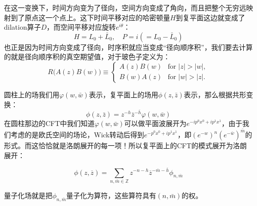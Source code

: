在这一变换下，时间方向变为了径向，空间方向变成了角向，而且把整个无穷远映射到了原点这一个点上。这下时间平移对应的哈密顿量$H$到复平面这边就变成了dilation算子$D$，而空间平移对应旋转$e^{i\theta}$：
\begin{equation}
		\boxed{H=L_0+\bar {L}_0,\quad P=i\left(=L_0-\bar {L}_0\right)}
\end{equation}
也正是因为时间方向变成了径向，时序积就应当变成“径向顺序积”，我们要去计算的就是径向顺序积的真空期望值，对于玻色子定义为：
\begin{equation}
	R\bigl(A(z)B(w)\bigr)\equiv\begin{cases}{}A(z)B(w)&\text{for }|z|>|w|,\\B(w)A(z)&\text{for }|w|>|z|.\end{cases}
\end{equation}

圆柱上的场我们用$\varphi(w,\bar w)$表示，复平面上的场用$\phi(z,\bar z)$表示，那么根据共形变换：
\begin{equation}
	\phi(z,\bar z)=z^{-h}{\bar {z}}^{-\bar h}\varphi(w,\bar w)
\end{equation}
在圆柱那边的CFT中我们知道$\varphi(w,\bar w)$可以做平面波展开为$e^{-ip^0x^0+ip^1x^1}$，由于我们考虑的是欧氏空间的场论，Wick转动后得到$e^{-p^0x^0+ip^1x^1}$，即$(e^{-w})^n(e^{-\bar w})^{\bar m}$的形式。而这恰恰就是洛朗展开的每一项！所以复平面上的CFT的模式展开为洛朗展开：
\begin{theorem}
	\begin{equation}
		\boxed{\phi(z,\overline{z})=\sum_{n,\overline{m}\in\mathbb{Z}}z^{-n-h}\overline{z}^{-\overline{m}-\overline{h}}\phi_{n,\overline{m}}}
	\end{equation}
\end{theorem}
量子化场就是把$\phi_{n,\bar m}$量子化为算符，这些算符具有$(n,\bar m)$的权。

